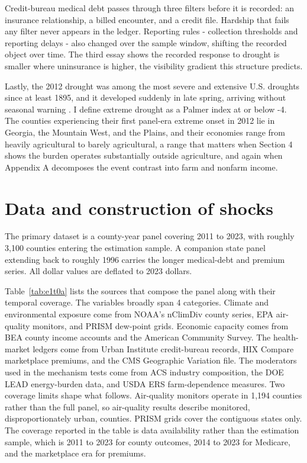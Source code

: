 \documentclass[a4paper,11pt]{article}
\begin{document}
Credit-bureau medical debt passes through three filters before it is recorded: an insurance relationship, a billed encounter, and a credit file. Hardship that fails any filter never appears in the ledger. Reporting rules - collection thresholds and reporting delays - also changed over the sample window, shifting the recorded object over time. The third essay shows the recorded response to drought is smaller where uninsurance is higher, the visibility gradient this structure predicts.

Lastly, the 2012 drought was among the most severe and extensive U.S. droughts since at least 1895, and it developed suddenly in late spring, arriving without seasonal warning \citep{hoerling2014drought}. I define extreme drought as a Palmer index at or below -4. The counties experiencing their first panel-era extreme onset in 2012 lie in Georgia, the Mountain West, and the Plains, and their economies range from heavily agricultural to barely agricultural, a range that matters when Section 4 shows the burden operates substantially outside agriculture, and again when Appendix A decomposes the event contrast into farm and nonfarm income.

\FloatBarrier
\section{Data and construction of shocks}

The primary dataset is a county-year panel covering 2011 to 2023, with roughly 3,100 counties entering the estimation sample. A companion state panel extending back to roughly 1996 carries the longer medical-debt and premium series. All dollar values are deflated to 2023 dollars.

Table~\ref{tab:e1t0a} lists the sources that compose the panel along with their temporal coverage. The variables broadly span 4 categories. Climate and environmental exposure come from NOAA's nClimDiv county series, EPA air-quality monitors, and PRISM dew-point grids. Economic capacity comes from BEA county income accounts and the American Community Survey. The health-market ledgers come from Urban Institute credit-bureau records, HIX Compare marketplace premiums, and the CMS Geographic Variation file. The moderators used in the mechanism tests come from ACS industry composition, the DOE LEAD energy-burden data, and USDA ERS farm-dependence measures. Two coverage limits shape what follows. Air-quality monitors operate in 1,194 counties rather than the full panel, so air-quality results describe monitored, disproportionately urban, counties. PRISM grids cover the contiguous states only. The coverage reported in the table is data availability rather than the estimation sample, which is 2011 to 2023 for county outcomes, 2014 to 2023 for Medicare, and the marketplace era for premiums.
\end{document}
